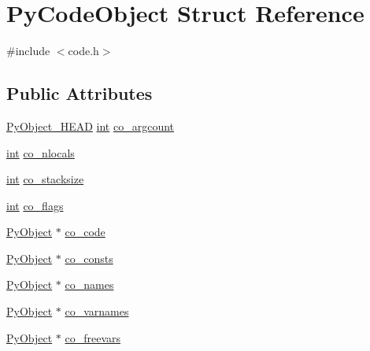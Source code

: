 \hypertarget{struct_py_code_object}{}\section{Py\+Code\+Object Struct Reference}
\label{struct_py_code_object}


{\ttfamily \#include $<$code.\+h$>$}

\subsection*{Public Attributes}
\begin{DoxyCompactItemize}
\item 
\mbox{\hyperlink{_python27_2object_8h_a0bf35c1f3ea13f925de94d8593db3b7e}{Py\+Object\+\_\+\+H\+E\+AD}} \mbox{\hyperlink{warnings_8h_a74f207b5aa4ba51c3a2ad59b219a423b}{int}} \mbox{\hyperlink{struct_py_code_object_adc0dadab6a4224c47cfccb332b2bd0b3}{co\+\_\+argcount}}
\item 
\mbox{\hyperlink{warnings_8h_a74f207b5aa4ba51c3a2ad59b219a423b}{int}} \mbox{\hyperlink{struct_py_code_object_a9365db6f0ac59f02a907b6bc41924f4c}{co\+\_\+nlocals}}
\item 
\mbox{\hyperlink{warnings_8h_a74f207b5aa4ba51c3a2ad59b219a423b}{int}} \mbox{\hyperlink{struct_py_code_object_ab171343772772be7a4911c28f96e415f}{co\+\_\+stacksize}}
\item 
\mbox{\hyperlink{warnings_8h_a74f207b5aa4ba51c3a2ad59b219a423b}{int}} \mbox{\hyperlink{struct_py_code_object_a678b33effc331fb223622fd7aea8fac3}{co\+\_\+flags}}
\item 
\mbox{\hyperlink{_python27_2object_8h_aadc84ac7aed2cfa6f20c25f62bf3dac7}{Py\+Object}} $\ast$ \mbox{\hyperlink{struct_py_code_object_a6f3c6ad3ccefda60ce7033c7375c17b0}{co\+\_\+code}}
\item 
\mbox{\hyperlink{_python27_2object_8h_aadc84ac7aed2cfa6f20c25f62bf3dac7}{Py\+Object}} $\ast$ \mbox{\hyperlink{struct_py_code_object_a4a19803042153ef763c58ab0980eb775}{co\+\_\+consts}}
\item 
\mbox{\hyperlink{_python27_2object_8h_aadc84ac7aed2cfa6f20c25f62bf3dac7}{Py\+Object}} $\ast$ \mbox{\hyperlink{struct_py_code_object_a830824fae12a5ef716896fa78a84adf2}{co\+\_\+names}}
\item 
\mbox{\hyperlink{_python27_2object_8h_aadc84ac7aed2cfa6f20c25f62bf3dac7}{Py\+Object}} $\ast$ \mbox{\hyperlink{struct_py_code_object_aff29dff0e2f511c562f3bc9a322321d0}{co\+\_\+varnames}}
\item 
\mbox{\hyperlink{_python27_2object_8h_aadc84ac7aed2cfa6f20c25f62bf3dac7}{Py\+Object}} $\ast$ \mbox{\hyperlink{struct_py_code_object_a89e2b8f2d3e34ce6b6a866da47c5ddbb}{co\+\_\+freevars}}

\end{DoxyCompactItemize}

